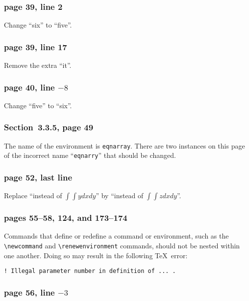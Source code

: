 \subsubsection*{page 39, line 2}

Change ``six'' to ``five''.

\subsubsection*{page 39, line 17}
Remove the extra ``it''.

\subsubsection*{page 40, line $-8$}
Change ``five'' to ``six''.

\subsubsection*{Section~3.3.5, page 49}
The name of the environment is {\tt eqnarray}.  There are two instances
on this page of the incorrect name ``{\tt eqnarry}'' that should be
changed.


\subsubsection*{page 52, last line}

Replace ``instead of $\int\int ydxdy$'' by 
``instead of $\int\int zdxdy$''.

\subsubsection*{pages 55--58, 124, and 173--174}

Commands that define or redefine a command or environment, such as the
\linebreak
\hbox{\verb|\newcommand|} and \hbox{\verb|\renewenvironment|} commands,
should not be nested within one another.  Doing so may result in the
following \TeX\ error:
\begin{verbatim}
! Illegal parameter number in definition of ... .
\end{verbatim}

\subsubsection*{page 56, line $-3$}

